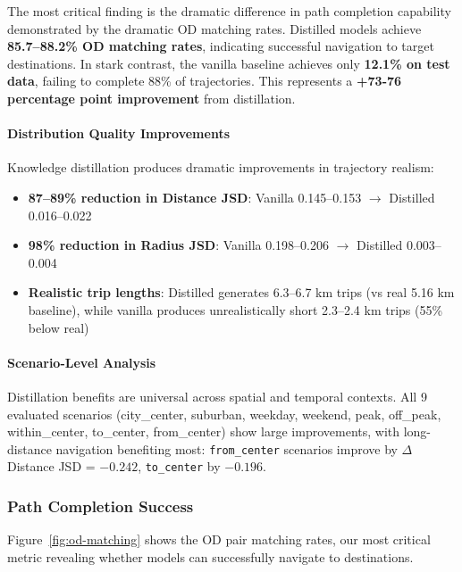 The most critical finding is the dramatic difference in path completion capability demonstrated by the dramatic OD matching rates. Distilled models achieve \textbf{85.7--88.2\% OD matching rates}, indicating successful navigation to target destinations. In stark contrast, the vanilla baseline achieves only \textbf{12.1\% on test data}, failing to complete 88\% of trajectories. This represents a \textbf{+73-76 percentage point improvement} from distillation.

\paragraph{Distribution Quality Improvements}
Knowledge distillation produces dramatic improvements in trajectory realism:
\begin{itemize}[leftmargin=*,noitemsep]
    \item \textbf{87--89\% reduction in Distance JSD}: Vanilla 0.145--0.153 $\to$ Distilled 0.016--0.022
    \item \textbf{98\% reduction in Radius JSD}: Vanilla 0.198--0.206 $\to$ Distilled 0.003--0.004
    \item \textbf{Realistic trip lengths}: Distilled generates 6.3--6.7 km trips (vs real 5.16 km baseline), while vanilla produces unrealistically short 2.3--2.4 km trips (55\% below real)
\end{itemize}

\paragraph{Scenario-Level Analysis}
Distillation benefits are universal across spatial and temporal contexts. All 9 evaluated scenarios (city\_center, suburban, weekday, weekend, peak, off\_peak, within\_center, to\_center, from\_center) show large improvements, with long-distance navigation benefiting most: \texttt{from\_center} scenarios improve by $\Delta$ Distance JSD = $-0.242$, \texttt{to\_center} by $-0.196$.

\subsubsection{Path Completion Success}

Figure~\ref{fig:od-matching} shows the OD pair matching rates, our most critical metric revealing whether models can successfully navigate to destinations.

